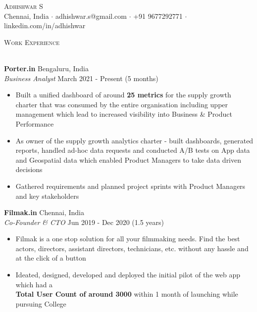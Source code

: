 \documentclass[a4paper]{article}
\newcommand{\lineunder} {
    \vspace*{-8pt} \\
    \hspace*{-18pt} \hrulefill \\
}
\newcommand{\header} [1] {
    {\hspace*{-18pt}\vspace*{6pt} \textsc{#1}}
    \vspace*{-6pt} \lineunder
}
\begin{document}
\vspace*{-40pt}

    

\vspace*{-10pt}
\begin{center}
    {\Huge \scshape {Adhishwar S}}\\
    Chennai, India $\cdot$ adhishwar.s@gmail.com $\cdot$ +91 9677292771 $\cdot$ linkedin.com/in/adhishwar\\
\end{center}

\header{Work Experience}
\vspace{1mm}


\textbf{Porter.in} \hfill Bengaluru, India\\
\textit{Business Analyst} \hfill March 2021 - Present (5 months)\\
\vspace{-1mm}
\begin{itemize} \itemsep 1pt
    \item Built a unified dashboard of around \textbf{25 metrics} for the supply growth charter that was consumed by the entire organisation including upper management which lead to increased visibility into Business \& Product Performance
    \item As owner of the supply growth analytics charter - built dashboards, generated reports, handled ad-hoc data requests and conducted A/B tests on App data and Geospatial data which enabled Product Managers to take data driven decisions
    \item Gathered requirements and planned project sprints with Product Managers and key stakeholders
\end{itemize}
\textbf{Filmak.in} \hfill Chennai, India\\
\textit{Co-Founder \& CTO} \hfill Jun 2019 - Dec 2020 (1.5 years)\\
\vspace{-1mm}
\begin{itemize} \itemsep 1pt
    \item Filmak is a one stop solution for all your filmmaking needs. Find the best actors, directors, assistant directors, technicians, etc. without any hassle and at the click of a button
    \item Ideated, designed, developed and deployed the initial pilot of the web app which had a\\ \textbf{Total User Count of around 3000} within 1 month of launching while pursuing College
\end{itemize}
\end{document}
